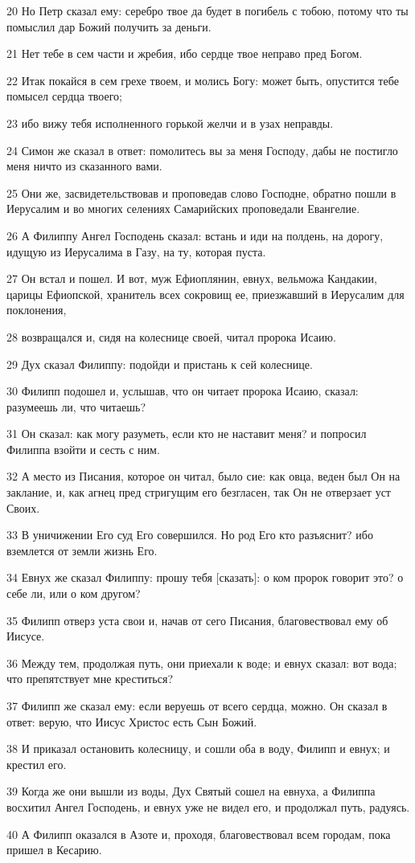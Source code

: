 \par 20 Но Петр сказал ему: серебро твое да будет в погибель с тобою, потому что ты помыслил дар Божий получить за деньги.
\par 21 Нет тебе в сем части и жребия, ибо сердце твое неправо пред Богом.
\par 22 Итак покайся в сем грехе твоем, и молись Богу: может быть, опустится тебе помысел сердца твоего;
\par 23 ибо вижу тебя исполненного горькой желчи и в узах неправды.
\par 24 Симон же сказал в ответ: помолитесь вы за меня Господу, дабы не постигло меня ничто из сказанного вами.
\par 25 Они же, засвидетельствовав и проповедав слово Господне, обратно пошли в Иерусалим и во многих селениях Самарийских проповедали Евангелие.
\par 26 А Филиппу Ангел Господень сказал: встань и иди на полдень, на дорогу, идущую из Иерусалима в Газу, на ту, которая пуста.
\par 27 Он встал и пошел. И вот, муж Ефиоплянин, евнух, вельможа Кандакии, царицы Ефиопской, хранитель всех сокровищ ее, приезжавший в Иерусалим для поклонения,
\par 28 возвращался и, сидя на колеснице своей, читал пророка Исаию.
\par 29 Дух сказал Филиппу: подойди и пристань к сей колеснице.
\par 30 Филипп подошел и, услышав, что он читает пророка Исаию, сказал: разумеешь ли, что читаешь?
\par 31 Он сказал: как могу разуметь, если кто не наставит меня? и попросил Филиппа взойти и сесть с ним.
\par 32 А место из Писания, которое он читал, было сие: как овца, веден был Он на заклание, и, как агнец пред стригущим его безгласен, так Он не отверзает уст Своих.
\par 33 В уничижении Его суд Его совершился. Но род Его кто разъяснит? ибо вземлется от земли жизнь Его.
\par 34 Евнух же сказал Филиппу: прошу тебя [сказать]: о ком пророк говорит это? о себе ли, или о ком другом?
\par 35 Филипп отверз уста свои и, начав от сего Писания, благовествовал ему об Иисусе.
\par 36 Между тем, продолжая путь, они приехали к воде; и евнух сказал: вот вода; что препятствует мне креститься?
\par 37 Филипп же сказал ему: если веруешь от всего сердца, можно. Он сказал в ответ: верую, что Иисус Христос есть Сын Божий.
\par 38 И приказал остановить колесницу, и сошли оба в воду, Филипп и евнух; и крестил его.
\par 39 Когда же они вышли из воды, Дух Святый сошел на евнуха, а Филиппа восхитил Ангел Господень, и евнух уже не видел его, и продолжал путь, радуясь.
\par 40 А Филипп оказался в Азоте и, проходя, благовествовал всем городам, пока пришел в Кесарию.

